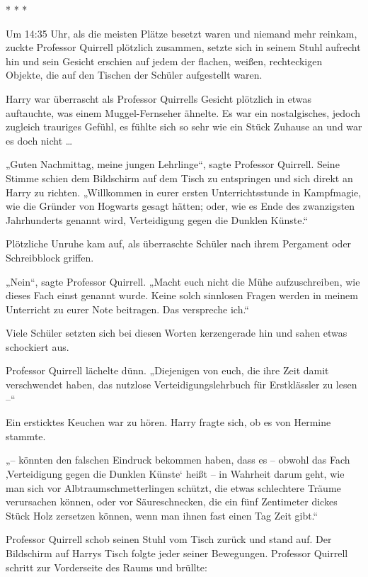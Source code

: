 {* * *

Um 14:35 Uhr, als die meisten Plätze besetzt waren und niemand mehr reinkam, zuckte Professor Quirrell plötzlich zusammen, setzte sich in seinem Stuhl aufrecht hin und sein Gesicht erschien auf jedem der flachen, weißen, rechteckigen Objekte, die auf den Tischen der Schüler aufgestellt waren.

Harry war überrascht als Professor Quirrells Gesicht plötzlich in etwas auftauchte, was einem Muggel-Fernseher ähnelte. Es war ein nostalgisches, jedoch zugleich trauriges Gefühl, es fühlte sich so sehr wie ein Stück Zuhause an und war es doch nicht …

„Guten Nachmittag, meine jungen Lehrlinge“, sagte Professor Quirrell. Seine Stimme schien dem Bildschirm auf dem Tisch zu entspringen und sich direkt an Harry zu richten. „Willkommen in eurer ersten Unterrichtsstunde in Kampfmagie, wie die Gründer von Hogwarts gesagt hätten; oder, wie es Ende des zwanzigsten Jahrhunderts genannt wird, Verteidigung gegen die Dunklen Künste.“

Plötzliche Unruhe kam auf, als überraschte Schüler nach ihrem Pergament oder Schreibblock griffen.

„Nein“, sagte Professor Quirrell. „Macht euch nicht die Mühe aufzuschreiben, wie dieses Fach einst genannt wurde. Keine solch sinnlosen Fragen werden in meinem Unterricht zu eurer Note beitragen. Das verspreche ich.“

Viele Schüler setzten sich bei diesen Worten kerzengerade hin und sahen etwas schockiert aus.

Professor Quirrell lächelte dünn. „Diejenigen von euch, die ihre Zeit damit verschwendet haben, das nutzlose Verteidigungslehrbuch für Erstklässler zu lesen --“

Ein ersticktes Keuchen war zu hören. Harry fragte sich, ob es von Hermine stammte.

„-- könnten den falschen Eindruck bekommen haben, dass es -- obwohl das Fach ‚Verteidigung gegen die Dunklen Künste` heißt -- in Wahrheit darum geht, wie man sich vor Albtraumschmetterlingen schützt, die etwas schlechtere Träume verursachen können, oder vor Säureschnecken, die ein fünf Zentimeter dickes Stück Holz zersetzen können, wenn man ihnen fast einen Tag Zeit gibt.“

Professor Quirrell schob seinen Stuhl vom Tisch zurück und stand auf. Der Bildschirm auf Harrys Tisch folgte jeder seiner Bewegungen. Professor Quirrell schritt zur Vorderseite des Raums und brüllte:

}
